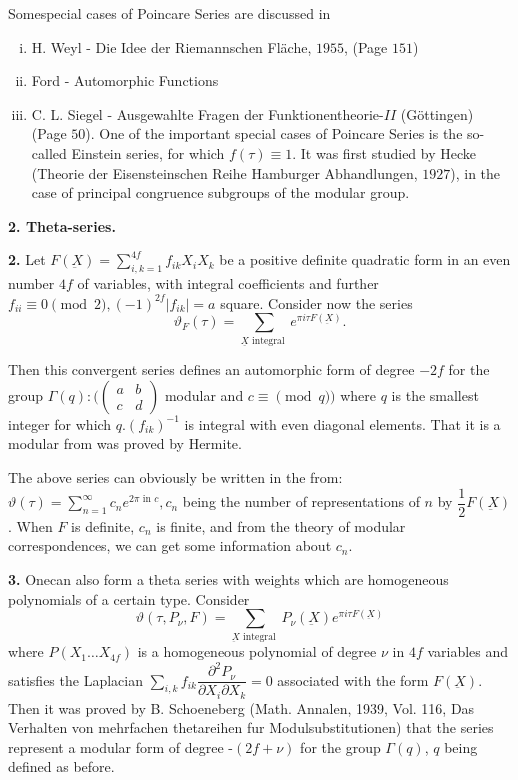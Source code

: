 Some\pageoriginale special cases of Poincare Series are discussed in 
\begin{enumerate}[(i)]
\item H. Weyl - Die Idee der Riemannschen Fl\"ache, $1955$, (Page $151$)
\item Ford - Automorphic Functions
\item C. L. Siegel - Ausgewahlte Fragen der Funktionentheorie-$II$\break
  (G\"ottingen) (Page $50$). One of the important special cases of
  Poin\-care Series is the so-called Einstein series, for which
  $f(\tau) \equiv 1$. It was first studied by Hecke (Theorie der
  Eisensteinschen Reihe Hamburger Abhandlungen, $1927$), in the case
  of principal congruence subgroups of the modular group. 
\end{enumerate}

\noindent 
\textbf{2. Theta-series.}%

\textbf{2.} Let $F(\underbar{X})= \sum \limits^{4f}_{i, k=1} f_{ik}X_i X_k$ be
a positive definite 	quadratic form in an even number $4f$ of
variables, with integral coefficients and further $f_{ii} \equiv
0 \pmod 2, (-1)^{2f}|f_{ik}| =a$ square. Consider now the series 
$$
\vartheta_F (\tau) = \sum_{\underline{X}\text{ integral }} e^{\pi i
  \tau F(\underbar{X})}. 
$$

Then this convergent series defines an automorphic form of degree
$-2f$ for the group $\Gamma(q): (\begin{pmatrix} a & b \\ c &
  d \end{pmatrix}$ modular and $c \equiv\pmod q)$ where $q$ is the
smallest integer for which $q.(f_{ik})^{-1}$ is integral with even
diagonal elements. That it is a modular from was proved by Hermite. 

The above series can obviously be written in the from: $\vartheta
(\tau) = \sum \limits^{\infty}_{n=1} c_n e^{2 \pi \text{ in }c},
c_n$ being the number of representations of $n$ by $\dfrac{1}{2}
F(\underbar{X})$. When $F$ is definite, $c_n$ is finite, and from the
theory of modular correspondences, we can get some information about
$c_n$. 

\textbf{3.} One\pageoriginale can also form a theta series with weights which are
homogeneous polynomials of a certain type. Consider 
$$
\vartheta(\tau, P_\nu, F) = \sum_{\underbar{X}\text{ integral }}P_\nu
(\underbar{X}) e^{\pi i \tau F(\underbar{X})} 
$$
where $P (X_1 \ldots X_{4f})$ is a homogeneous polynomial of degree
$\nu$ in $4f$ variables and satisfies the Laplacian $\sum
\limits_{i,k} f_{ik} \dfrac{\partial^2 P_\nu}{\partial X_i \partial
  X_k}= 0 $ associated with the form $F(\underbar{X})$. Then it was
proved by B. Schoeneberg (Math. Annalen, 1939, Vol. 116, Das Verhalten
von mehrfachen thetareihen fur Modulsubstitutionen) that the series
represent a modular form of degree -$(2f+ \nu)$ for the group
$\Gamma(q)$, $q$ being defined as before. 

